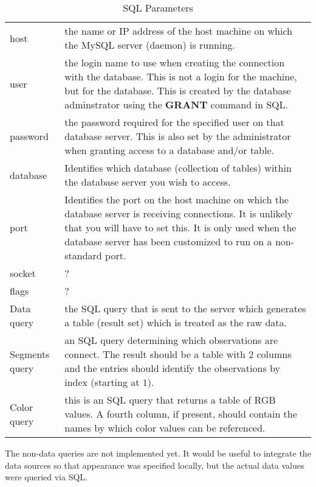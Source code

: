 \documentclass{article}
\def\SqlKeyword#1{\textbf{#1}}
\begin{document}
\begin{table}[htbp]
  \begin{center}
    \leavevmode
\begin{tabular}{ll}\label{tab:mysqlLogin}
host & the name or IP address of the host 
machine on which the MySQL server (daemon)
is running.\\
user &  the login name to use when creating the
connection with the database. This is not a login
for the machine, but for the database. This
is created by the database adminstrator
using the \SqlKeyword{GRANT} command in SQL. \\
password & the password required for the
specified user on that database server.
This is also set by the administrator
when granting access to a database and/or table.
\\
database &   Identifies
which database (collection of tables) within
the database server you wish to access. \\

port & Identifies the port on the host machine on which the database
server is receiving connections.  It is unlikely that you will have to
set this. It is only used when the database server has been customized
to run on a non-standard port. \\ 

socket & ? \\
flags &  ? \\
Data query & the SQL query that is sent to
the server which generates 
a table (result set) which is  treated
as the raw data.  \\
Segments query &  an SQL query
determining which observations are connect.
The result should be a table with $2$ columns
and the entries should identify 
the observations by index (starting at $1$).
 \\

Color query & this is an SQL query that returns a table of RGB values.
A fourth column, if present, should contain the names by which color
values can be referenced.
\end{tabular}
    \caption{SQL Parameters}
    \label{tab:mysqlLogin}
  \end{center}
\end{table}
The non-data queries are not implemented yet.  It would be useful to
integrate the data sources so that appearance was specified locally,
but the actual data values were queried via SQL.
\end{document}
